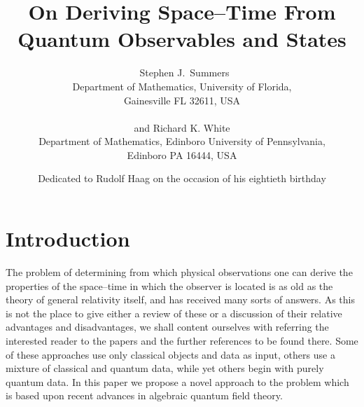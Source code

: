 \documentclass[a4paper,twoside,12pt]{article}
\begin{document}
\title{On Deriving Space--Time From Quantum Observables and States} 

\author{{\ Stephen J.\ Summers}\\
Department of Mathematics, University of Florida,\\
Gainesville FL 32611, USA\\
\vphantom{X}\\
{and Richard K. White } \\
Department of Mathematics, Edinboro University of Pennsylvania,\\
Edinboro PA 16444, USA\\}

\date{\normalsize{
Dedicated to Rudolf Haag on the occasion of his eightieth birthday
}} 

\maketitle 


\section{Introduction}

     The problem of determining from which physical observations one
can derive the properties of the space--time in which the observer is
located is as old as the theory of general relativity itself, and has
received many sorts of answers. As this is not the place to give
either a review of these or a discussion of their relative advantages
and disadvantages, we shall content ourselves with referring the
interested reader to the papers \cite{EPS,Au,AL,Ban,BHF} and the
further references to be found there. Some of these approaches use
only classical objects and data as input, others use a mixture of
classical and quantum data, while yet others begin with purely quantum
data.  In this paper we propose a novel approach to the problem which
is based upon recent advances in algebraic quantum field theory.
\end{document}
